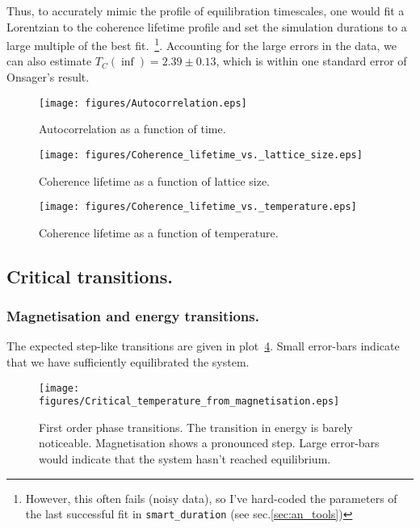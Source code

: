 \documentclass[12pt]{article}
\begin{document}
Thus, to accurately mimic the profile of equilibration timescales, one would fit a Lorentzian to the coherence lifetime profile and set the simulation durations to a large multiple of the best fit.~\footnote{However, this often fails (noisy data), so I've hard-coded the parameters of the last successful fit in \texttt{smart\_duration} (see sec.\ref{sec:an_tools})}. Accounting for the large errors in the data, we can also estimate \(T_C(\inf) = 2.39 \pm 0.13\), which is within one standard error of Onsager's result. 

\begin{figure}[hp]
  \centering
  \texttt{[image: figures/Autocorrelation.eps]}
  \caption{Autocorrelation as a function of time. }\label{fig:auto_time_plot}
\end{figure}

\begin{figure}[hp]
  \centering
  \texttt{[image: figures/Coherence\_lifetime\_vs.\_lattice\_size.eps]}

  \caption{Coherence lifetime as a function of lattice size. }\label{fig:coherence_size}
\end{figure}

\begin{figure}[hp]
  \texttt{[image: figures/Coherence\_lifetime\_vs.\_temperature.eps]}
  \caption{Coherence lifetime as a function of temperature.}\label{fig:coherence_temp}
\end{figure}

  
\subsection{Critical transitions.}

\subsubsection{Magnetisation and energy transitions.}

The expected step-like transitions are given in plot~\ref{fig:first_order_transitions}. Small error-bars indicate that we have sufficiently equilibrated the system. 

\begin{figure}[hp]
  \texttt{[image: figures/Critical\_temperature\_from\_magnetisation.eps]}
  \caption{First order phase transitions. The transition in energy is barely noticeable. Magnetisation shows a pronounced step. Large error-bars would indicate that  the system hasn't reached equilibrium.}\label{fig:first_order_transitions}
\end{figure}
\end{document}
